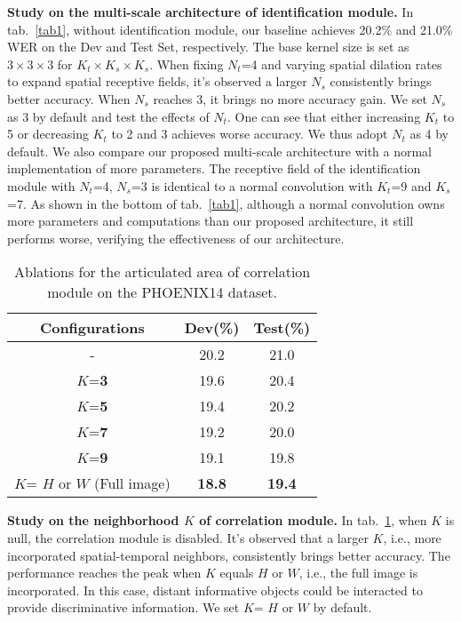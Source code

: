 \documentclass[10pt,twocolumn,letterpaper]{article}
\begin{document}
\textbf{Study on the multi-scale architecture of identification module.} In tab.~\ref{tab1}, without identification module, our baseline achieves 20.2\% and 21.0\% WER on the Dev and Test Set, respectively. The base kernel size is set as $3\times 3\times 3$ for $K_t\times K_s\times K_s$. When fixing $N_t$=4 and varying spatial dilation rates to expand spatial receptive fields, it's observed a larger $N_s$ consistently brings better accuracy. When $N_s$ reaches 3, it brings no more accuracy gain. We set $N_s$ as 3 by default and test the effects of $N_t$. One can see that either increasing $K_t$ to 5 or decreasing $K_t$ to 2 and 3 achieves worse accuracy. We thus adopt $N_t$ as 4 by default. We also compare our proposed multi-scale architecture with a normal implementation of more parameters. The receptive field of the identification module with $N_t$=4, $N_s$=3 is identical to a normal convolution with $K_t$=9 and $K_s$=7. As shown in the bottom of tab.~\ref{tab1}, although a normal convolution owns more parameters and computations than our proposed architecture, it still performs worse, verifying the effectiveness of our architecture.

\begin{table}[t]   
  \centering
  \begin{tabular}{ccc}
  \hline
  Configurations  & Dev(\%) & Test(\%)\\
  \hline
  - & 20.2 & 21.0\\
  $K$=\textbf{3} & 19.6  & 20.4 \\
  $K$=\textbf{5} & 19.4 & 20.2 \\
  $K$=\textbf{7} & 19.2 & 20.0 \\
  $K$=\textbf{9} & 19.1  & 19.8 \\
  $K$= $H$ or $W$ (Full image) & \textbf{18.8} & \textbf{19.4} \\
  \hline
  \end{tabular}
  \caption{Ablations for the articulated area of correlation module on the PHOENIX14 dataset.} 
  \label{tab2} 
  \end{table}

\textbf{Study on the neighborhood $K$ of correlation module.} In tab.~\ref{tab2}, when $K$ is null, the correlation module is disabled. It's observed that a larger $K$, i.e., more incorporated spatial-temporal neighbors, consistently brings better accuracy. The performance reaches the peak when $K$ equals $H$ or $W$, i.e., the full image is incorporated. In this case, distant informative objects could be interacted to provide discriminative information. We set $K$= $H$ or $W$ by default.
\end{document}

